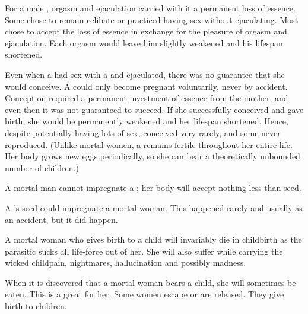 For a male \resphan, orgasm and ejaculation carried with it a permanent loss of essence. 
Some \resphain chose to remain celibate or practiced having sex without ejaculating. 
Most \resphain chose to accept the loss of essence in exchange for the pleasure of orgasm and ejaculation. 
Each orgasm would leave him slightly weakened and his lifespan shortened. 

Even when a \resphan had sex with a \resvil and ejaculated, there was no guarantee that she would conceive. 
A \resvil could only become pregnant voluntarily, never by accident. 
Conception required a permanent investment of essence from the mother, and even then it was not guaranteed to succeed. 
If she successfully conceived and gave birth, she would be permanently weakened and her lifespan shortened.
Hence, despite potentially having lots of sex, \resviel conceived very rarely, and some never reproduced. 
(Unlike mortal women, a \resvil{} remains fertile throughout her entire life. 
Her body grows new eggs periodically, so she can bear a theoretically unbounded number of children.) 

A mortal man cannot impregnate a \resvil; her body will accept nothing less than \resphan{} seed. 

A \resphan's seed could impregnate a mortal woman.
This happened rarely and usually as an accident, but it did happen. 

A mortal woman who gives birth to a \resphan{} child will invariably die in childbirth as the parasitic \resphan{} sucks all life-force out of her. 
She will also suffer while carrying the wicked child\dash pain, nightmares, hallucination and possibly madness. 

When it is discovered that a mortal woman bears a \resphan{} child, she will sometimes be eaten. 
This is a great \honour for her. 
Some women escape or are released. 
They give birth to  children. 





